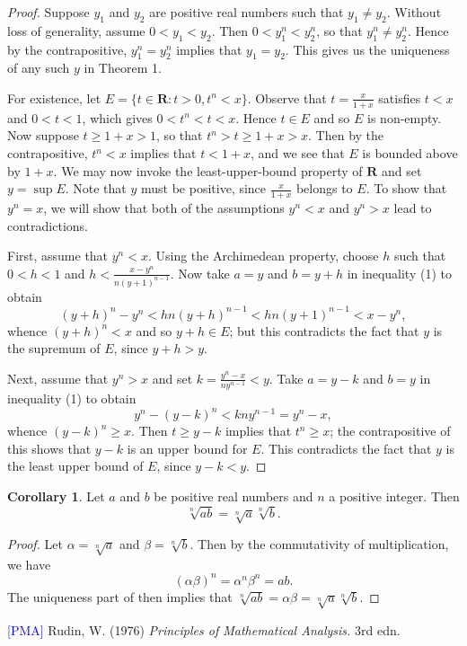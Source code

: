 \documentclass[12pt]{article}
\theoremstyle{definition}
\newtheorem{corollary}[theorem]{Corollary}
\newcommand{\R}{\mathbf{R}}
\begin{document}
\begin{proof}
    Suppose \( y_1 \) and \( y_2 \) are positive real numbers such that \( y_1 \neq y_2 \). Without loss of generality, assume \( 0 < y_1 < y_2 \). Then \( 0 < y_1^n < y_2^n \), so that \( y_1^n \neq y_2^n \). Hence by the contrapositive, \( y_1^n = y_2^n \) implies that \( y_1 = y_2 \). This gives us the uniqueness of any such \( y \) in Theorem 1.
    
    For existence, let \( E = \{ t \in \R : t > 0, t^n < x \} \). Observe that \( t = \frac{x}{1 + x} \) satisfies \( t < x \) and \( 0 < t < 1 \), which gives \( 0 < t^n < t < x \). Hence \( t \in E \) and so \( E \) is non-empty. Now suppose \( t \geq 1 + x > 1 \), so that \( t^n > t \geq 1 + x > x \). Then by the contrapositive, \( t^n < x \) implies that \( t < 1 + x \), and we see that \( E \) is bounded above by \( 1 + x \). We may now invoke the least-upper-bound property of \( \R \) and set \( y = \sup E \). Note that \( y \) must be positive, since \( \frac{x}{1 + x} \) belongs to \( E \). To show that \( y^n = x \), we will show that both of the assumptions \( y^n < x \) and \( y^n > x \) lead to contradictions.
    
    First, assume that \( y^n < x \). Using the Archimedean property, choose \( h \) such that \( 0 < h < 1 \) and \( h < \frac{x - y^n}{n (y+1)^{n-1}} \). Now take \( a = y \) and \( b = y + h \) in inequality (1) to obtain
    \[
    (y + h)^n - y^n < h n (y + h)^{n-1} < h n (y + 1)^{n-1} < x - y^n,
    \]
    whence \( (y + h)^n < x \) and so \( y + h \in E \); but this contradicts the fact that \( y \) is the supremum of \( E \), since \( y + h > y \).
    
    Next, assume that \( y^n > x \) and set \( k = \frac{y^n - x}{ny^{n-1}} < y \). Take \( a = y - k \) and \( b = y \) in inequality (1) to obtain
    \[
    y^n - (y - k)^n < kny^{n-1} = y^n - x,
    \]
    whence \( (y - k)^n \geq x \). Then \( t \geq y - k \) implies that \( t^n \geq x \); the contrapositive of this shows that \( y - k \) is an upper bound for \( E \). This contradicts the fact that \( y \) is the least upper bound of \( E \), since \( y - k < y \).
\end{proof}

\begin{corollary}
\label{cor:exponent_rule}
    Let \( a \) and \( b \) be positive real numbers and \( n \) a positive integer. Then
    \[
    \sqrt[n]{ab} = \sqrt[n]{a}\sqrt[n]{b}.
    \]
\end{corollary}

\begin{proof}
    Let \( \alpha = \sqrt[n]{a} \) and \( \beta = \sqrt[n]{b} \). Then by the commutativity of multiplication, we have
    \[
    (\alpha \beta)^n = \alpha^n \beta^n = ab.
    \]
    The uniqueness part of  then implies that \( \sqrt[n]{ab} = \alpha \beta = \sqrt[n]{a} \sqrt[n]{b} \).
\end{proof}

\noindent \hrulefill

\noindent \hypertarget{pma}{\textcolor{blue}{[PMA]} Rudin, W. (1976) \textit{Principles of Mathematical Analysis.} 3rd edn.}
\end{document}
